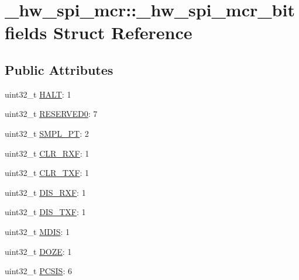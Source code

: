 \hypertarget{struct__hw__spi__mcr_1_1__hw__spi__mcr__bitfields}{}\section{\+\_\+hw\+\_\+spi\+\_\+mcr\+:\+:\+\_\+hw\+\_\+spi\+\_\+mcr\+\_\+bitfields Struct Reference}
\label{struct__hw__spi__mcr_1_1__hw__spi__mcr__bitfields}
\subsection*{Public Attributes}
\begin{DoxyCompactItemize}
\item 
uint32\+\_\+t \hyperlink{struct__hw__spi__mcr_1_1__hw__spi__mcr__bitfields_a999404b6524ac9a96e30406c99ab22de}{H\+A\+LT}\+: 1
\item 
uint32\+\_\+t \hyperlink{struct__hw__spi__mcr_1_1__hw__spi__mcr__bitfields_a255e0bc4fef67697416d58cecf2988f6}{R\+E\+S\+E\+R\+V\+E\+D0}\+: 7
\item 
uint32\+\_\+t \hyperlink{struct__hw__spi__mcr_1_1__hw__spi__mcr__bitfields_aebe08a335ff44f8dee8b9d204f9f2ddc}{S\+M\+P\+L\+\_\+\+PT}\+: 2
\item 
uint32\+\_\+t \hyperlink{struct__hw__spi__mcr_1_1__hw__spi__mcr__bitfields_a8f6ac10b6973ca7de82dc4d65c87289c}{C\+L\+R\+\_\+\+R\+XF}\+: 1
\item 
uint32\+\_\+t \hyperlink{struct__hw__spi__mcr_1_1__hw__spi__mcr__bitfields_a3982be4fab76abd2dafb2e8a296debc3}{C\+L\+R\+\_\+\+T\+XF}\+: 1
\item 
uint32\+\_\+t \hyperlink{struct__hw__spi__mcr_1_1__hw__spi__mcr__bitfields_a3f12de4905944876d1358d10ce1697bd}{D\+I\+S\+\_\+\+R\+XF}\+: 1
\item 
uint32\+\_\+t \hyperlink{struct__hw__spi__mcr_1_1__hw__spi__mcr__bitfields_a4d3ec2c3c4ca0b38c9b71b2e080b45bd}{D\+I\+S\+\_\+\+T\+XF}\+: 1
\item 
uint32\+\_\+t \hyperlink{struct__hw__spi__mcr_1_1__hw__spi__mcr__bitfields_a5cf3fae1b73338f0e1616883f8cc0db2}{M\+D\+IS}\+: 1
\item 
uint32\+\_\+t \hyperlink{struct__hw__spi__mcr_1_1__hw__spi__mcr__bitfields_acf57e1f623fd8efe6a3f00e0026c3208}{D\+O\+ZE}\+: 1
\item 
uint32\+\_\+t \hyperlink{struct__hw__spi__mcr_1_1__hw__spi__mcr__bitfields_a51f524338407064dc084cfd0ba3794c0}{P\+C\+S\+IS}\+: 6
\item 

\end{DoxyCompactItemize}

